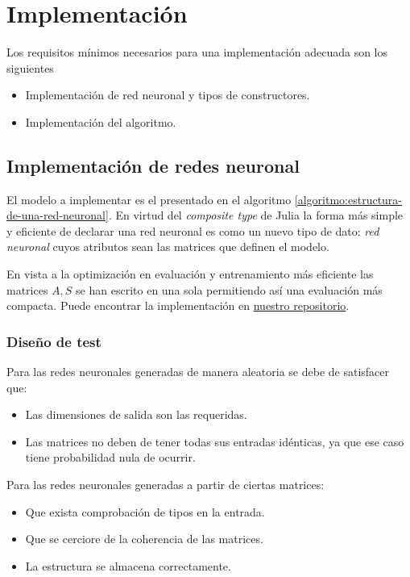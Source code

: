 
\section{Implementación}
\label{ch07:Implementar} 

Los requisitos mínimos necesarios para una implementación adecuada son los siguientes
\begin{itemize}
    \item Implementación de red neuronal y tipos de constructores.
    \item Implementación del algoritmo. 
\end{itemize}

\subsection{Implementación de redes neuronal}

El modelo  a implementar es el presentado en el algoritmo \ref{algoritmo:estructura-de-una-red-neuronal}. En virtud del \textit{composite type} de Julia  la forma más simple y eficiente de 
declarar una red neuronal es como un nuevo tipo de dato: \textit{red neuronal} cuyos atributos sean las matrices que definen el modelo. 

En vista a la optimización en evaluación y 
entrenamiento más eficiente las matrices 
$A, S$ se han escrito en una sola permitiendo así una evaluación más compacta. 
Puede encontrar la implementación 
en \href{https://github.com/BlancaCC/TFG-Estudio-de-las-redes-neuronales/tree/main/OptimimizedNeuralNetwork.jl/src}{nuestro repositorio}.
\subsubsection{Diseño de test} 
Para las redes neuronales generadas de manera aleatoria se debe de satisfacer que: 
\begin{itemize}
    \item Las dimensiones de salida son las requeridas.
    \item Las matrices no deben de tener todas sus entradas idénticas, ya que ese caso tiene probabilidad nula de ocurrir. 
\end{itemize}

Para las redes neuronales generadas a partir de 
ciertas matrices: 
\begin{itemize}
    \item Que exista comprobación de tipos en la entrada.
    \item Que se cerciore de la coherencia de las matrices.
    \item  La estructura se almacena correctamente. 
\end{itemize}

